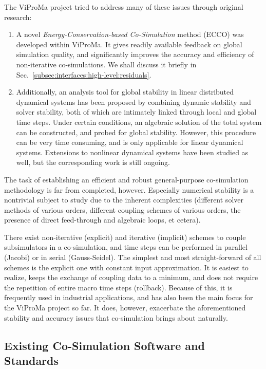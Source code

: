 \documentclass[prb,aps,showpacs,floatfix,twocolumn,10pt]{revtex4-1}
\newcommand{\sub}{subsimulator}
\theoremstyle{plain}
\theoremstyle{remark}
\begin{document}
The ViProMa project tried to address many of these issues through original research:
\begin{enumerate}
	\item A novel \emph{Energy-Conservation-based Co-Simulation} method\cite{Sadjina2016,Sadjina2016b} (ECCO) was developed within ViProMa.
	It gives readily available feedback on global simulation quality, and significantly improves the accuracy and efficiency of non-iterative co-simulations.
	We shall discuss it briefly in Sec.~\ref{subsec:interfaces:high-level:residuals}.
	\item Additionally, an analysis tool for global stability in linear distributed dynamical systems has been proposed by combining dynamic stability and solver stability,\cite{Skjong2016b} both of which are intimately linked through local and global time steps.
	Under certain conditions, an algebraic solution of the total system can be constructed, and probed for global stability.
	However, this procedure can be very time consuming, and is only applicable for linear dynamical systems.
	Extensions to nonlinear dynamical systems have been studied as well, but the corresponding work is still ongoing.
\end{enumerate}
The task of establishing an efficient and robust general-purpose co-simulation methodology is far from completed, however.
Especially numerical stability is a nontrivial subject to study due to the inherent complexities (different solver methods of various orders, different coupling schemes of various orders, the presence of direct feed-through and algebraic loops, et cetera).

There exist non-iterative (explicit) and iterative (implicit) schemes to couple \sub{}s in a co-simulation, and time steps can be performed in parallel (Jacobi) or in serial (Gauss-Seidel).
The simplest and most straight-forward of all schemes is the explicit one with constant input approximation.
It is easiest to realize, keeps the exchange of coupling data to a minimum, and does not require the repetition of entire macro time steps (rollback).
Because of this, it is frequently used in industrial applications, and has also been the main focus for the ViProMa project so far.
It does, however, exacerbate the aforementioned stability and accuracy issues that co-simulation brings about naturally.


\subsection{Existing Co-Simulation Software and Standards}
\label{subsec:cosimulation:existing-software}
\end{document}
